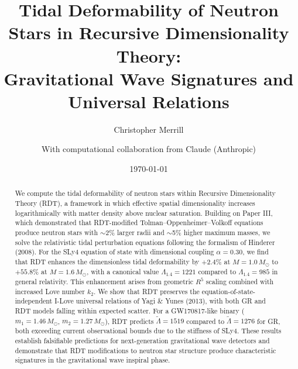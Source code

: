 \documentclass[twocolumn,showpacs,preprintnumbers,amsmath,amssymb,prd]{revtex4-2}
\begin{document}
\title{Tidal Deformability of Neutron Stars in Recursive Dimensionality Theory: \\
Gravitational Wave Signatures and Universal Relations}

\author{Christopher Merrill}
\author{With computational collaboration from Claude (Anthropic)}

\date{\today}

\begin{abstract}
We compute the tidal deformability of neutron stars within Recursive Dimensionality Theory (RDT), a framework in which effective spatial dimensionality increases logarithmically with matter density above nuclear saturation. Building on Paper III, which demonstrated that RDT-modified Tolman--Oppenheimer--Volkoff equations produce neutron stars with $\sim$2\% larger radii and $\sim$5\% higher maximum masses, we solve the relativistic tidal perturbation equations following the formalism of Hinderer (2008). For the SLy4 equation of state with dimensional coupling $\alpha = 0.30$, we find that RDT enhances the dimensionless tidal deformability by $+2.4\%$ at $M = 1.0\,M_\odot$ to $+55.8\%$ at $M = 1.6\,M_\odot$, with a canonical value $\Lambda_{1.4} = 1221$ compared to $\Lambda_{1.4} = 985$ in general relativity. This enhancement arises from geometric $R^5$ scaling combined with increased Love number $k_2$. We show that RDT preserves the equation-of-state-independent I-Love universal relations of Yagi \& Yunes (2013), with both GR and RDT models falling within expected scatter. For a GW170817-like binary ($m_1 = 1.46\,M_\odot$, $m_2 = 1.27\,M_\odot$), RDT predicts $\tilde{\Lambda} = 1519$ compared to $\tilde{\Lambda} = 1276$ for GR, both exceeding current observational bounds due to the stiffness of SLy4. These results establish falsifiable predictions for next-generation gravitational wave detectors and demonstrate that RDT modifications to neutron star structure produce characteristic signatures in the gravitational wave inspiral phase.
\end{abstract}


\maketitle

\end{document}
